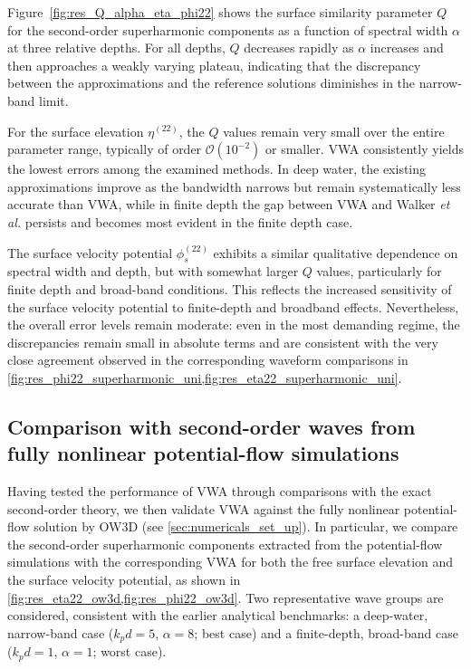 \documentclass[lineno]{JFM-FLM_Au}
\begin{document}
Figure~\ref{fig:res_Q_alpha_eta_phi22} shows the surface similarity parameter $Q$ for the second-order superharmonic components as a function of spectral width $\alpha$ at three relative depths. For all depths, $Q$ decreases rapidly as $\alpha$ increases and then approaches a weakly varying plateau, indicating that the discrepancy between the approximations and the reference solutions diminishes in the narrow-band limit.

For the surface elevation $\eta^{(22)}$, the $Q$ values remain very small over the entire parameter range, typically of order $\mathcal{O}(10^{-2})$ or smaller. VWA consistently yields the lowest errors among the examined methods. In deep water, the existing approximations improve as the bandwidth narrows but remain systematically less accurate than VWA, while in finite depth the gap between VWA and Walker \textit{et al.} persists and becomes most evident in the finite depth case.

The surface velocity potential $\phi_s^{(22)}$ exhibits a similar qualitative dependence on spectral width and depth, but with somewhat larger $Q$ values, particularly for finite depth and broad-band conditions. This reflects the increased sensitivity of the surface velocity potential to finite-depth and broadband effects. Nevertheless, the overall error levels remain moderate: even in the most demanding regime, the discrepancies remain small in absolute terms and are consistent with the very close agreement observed in the corresponding waveform comparisons in \cref{fig:res_phi22_superharmonic_uni,fig:res_eta22_superharmonic_uni}.


\subsection{Comparison with second-order waves from fully nonlinear potential-flow simulations}
Having tested the performance of VWA through comparisons with the exact second-order theory, we then validate VWA against the fully nonlinear potential-flow solution by OW3D (see \cref{sec:numericals_set_up}). In particular, we compare the second-order superharmonic components extracted from the potential-flow simulations with the corresponding VWA for both the free surface elevation and the surface velocity potential, as shown in \cref{fig:res_eta22_ow3d,fig:res_phi22_ow3d}. Two representative wave groups are considered, consistent with the earlier analytical benchmarks: a deep-water, narrow-band case ($k_pd=5$, $\alpha=8$; best case) and a finite-depth, broad-band case ($k_pd=1$, $\alpha=1$; worst case).
\end{document}

